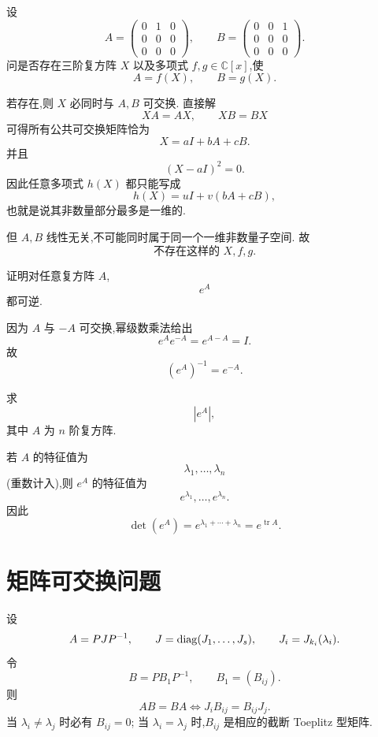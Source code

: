\begin{example}
设
\[
A=
\begin{pmatrix}
0&1&0\\
0&0&0\\
0&0&0
\end{pmatrix},
\qquad
B=
\begin{pmatrix}
0&0&1\\
0&0&0\\
0&0&0
\end{pmatrix}.
\]
问是否存在三阶复方阵 $X$ 以及多项式 $f,g\in\mathbb{C}[x]$,使
\[
A=f(X),\qquad B=g(X).
\]
\end{example}
\exampleblank

\begin{solution}
若存在,则 $X$ 必同时与 $A,B$ 可交换.
直接解
\[
XA=AX,\qquad XB=BX
\]
可得所有公共可交换矩阵恰为
\[
X=
aI+bA+cB.
\]
并且
\[
(X-aI)^2=0.
\]
因此任意多项式 $h(X)$ 都只能写成
\[
h(X)=uI+v(bA+cB),
\]
也就是说其非数量部分最多是一维的.

但 $A,B$ 线性无关,不可能同时属于同一个一维非数量子空间.
故
\[
\boxed{\text{不存在这样的 }X,f,g.}
\]
\end{solution}


\begin{example}
证明对任意复方阵 $A$,
\[
e^A
\]
都可逆.
\end{example}
\exampleblank

\begin{solution}
因为 $A$ 与 $-A$ 可交换,幂级数乘法给出
\[
e^Ae^{-A}=e^{A-A}=I.
\]
故
\[
\boxed{(e^A)^{-1}=e^{-A}}.
\]
\end{solution}


\begin{example}
求
\[
|e^A|,
\]
其中 $A$ 为 $n$ 阶复方阵.
\end{example}
\exampleblank

\begin{solution}
若 $A$ 的特征值为
\[
\lambda_1,\ldots,\lambda_n
\]
(重数计入),则 $e^A$ 的特征值为
\[
e^{\lambda_1},\ldots,e^{\lambda_n}.
\]
因此
\[
\boxed{
\det(e^A)
=
e^{\lambda_1+\cdots+\lambda_n}
=
e^{\operatorname{tr}A}.
}
\]
\end{solution}


\newpage

\section{矩阵可交换问题}

设
\[
A=PJP^{-1},
\qquad
J=\operatorname{diag}(J_1,\ldots,J_s),
\qquad
J_i=J_{k_i}(\lambda_i).
\]
令
\[
B=PB_1P^{-1},
\qquad
B_1=(B_{ij}).
\]
则
\[
AB=BA
\iff
J_iB_{ij}=B_{ij}J_j.
\]
当 $\lambda_i\neq\lambda_j$ 时必有 $B_{ij}=0$;
当 $\lambda_i=\lambda_j$ 时,$B_{ij}$ 是相应的截断 Toeplitz 型矩阵.

